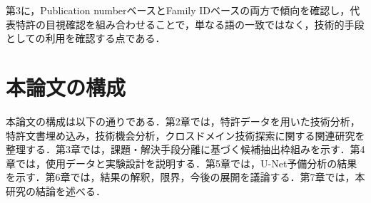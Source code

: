 第3に，Publication numberベースとFamily IDベースの両方で傾向を確認し，代表特許の目視確認を組み合わせることで，単なる語の一致ではなく，技術的手段としての利用を確認する点である．

\section{本論文の構成}
本論文の構成は以下の通りである．第2章では，特許データを用いた技術分析，特許文書埋め込み，技術機会分析，クロスドメイン技術探索に関する関連研究を整理する．第3章では，課題・解決手段分離に基づく候補抽出枠組みを示す．第4章では，使用データと実験設計を説明する．第5章では，U-Net予備分析の結果を示す．第6章では，結果の解釈，限界，今後の展開を議論する．第7章では，本研究の結論を述べる．
